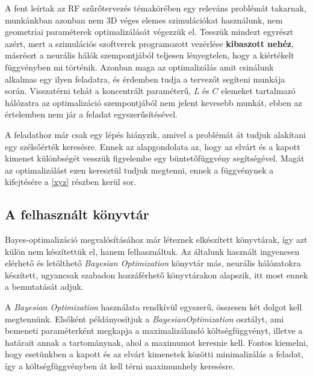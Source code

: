 		A fent leírtak az RF szűrőtervezés témakörében egy releváns problémát takarnak, munkánkban azonban nem 3D véges elemes szimulációkat használunk, nem geometriai paraméterek optimalizálását végezzük el. Tesszük mindezt egyrészt azért, mert a szimulációs szoftverek programozott vezérlése \textbf{kibaszott nehéz}, másrészt a neurális hálók szempontjából teljesen lényegtelen, hogy a kiértékelt függvényben mi történik. Azonban maga az optimalizálás amit csinálunk alkalmas egy ilyen feladatra, és érdemben tudja a tervezőt segíteni munkája során. Visszatérni tehát a koncentrált paraméterű, $L$ és $C$ elemeket tartalmazó hálózatra az optimalizáció szempontjából nem jelent kevesebb munkát, ebben az értelemben nem jár a feladat egyszerűsítésével.
		
		A feladathoz már csak egy lépés hiányzik, amivel a problémát át tudjuk alakítani egy szélsőérték keresésre. Ennek az alapgondolata az, hogy az elvárt és a kapott kimenet különbségét vesszük figyelembe egy büntetőfüggvény segítségével. Magát az optimalizálást ezen keresztül tudjuk megtenni, ennek a függvénynek a kifejtésére a \ref{xyz} részben kerül sor.
		
	\subsection{A felhasznált könyvtár}
	
		Bayes-optimalizáció megvalósításához már léteznek elkészített könyvtárak, így azt külön nem készítettük el, hanem felhasználtuk. Az általunk használt ingyenesen elérhető és letölthető \textit{Bayesian Optimization} könyvtár más, neurális hálózatokra készített, ugyancsak szabadon hozzáférhető könyvtárakon alapszik, itt most ennek a bemutatását adjuk.
		
		A \textit{Bayesian Optimization} használata rendkívül egyszerű, összesen két dolgot kell megtennünk. Elsőként példányosítjuk a \textit{BayesianOptimization} osztályt, ami bemeneti paraméterként megkapja a maximalizálandó költségfüggvényt, illetve a határait annak a tartománynak, ahol a maximumot keresnie kell. Fontos kiemelni, hogy esetünkben a kapott és az elvárt kimenetek közötti minimalizálás a feladat, így a költségfüggvényben át kell térni maximumhely keresésre. 
		
